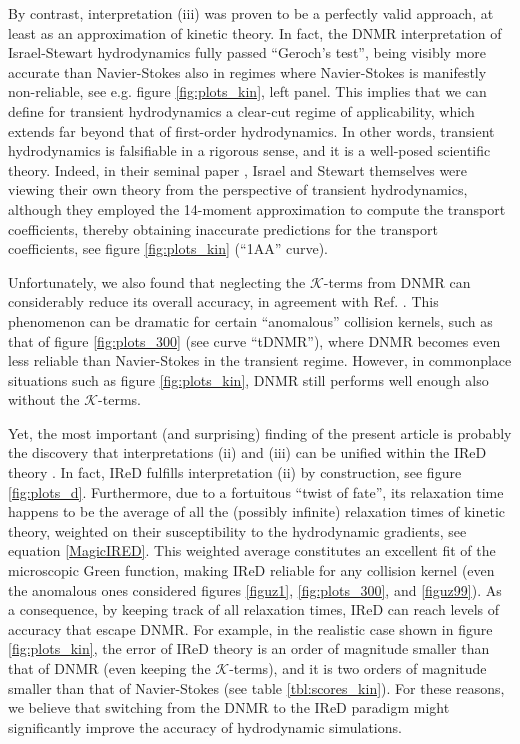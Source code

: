 \documentclass[a4paper, amsfonts, amssymb, amsmath, reprint, showkeys, nofootinbib, twoside, onecolumn,notitlepage]{revtex4-2}
\begin{document}
By contrast, interpretation (iii) was proven to be a perfectly valid approach, at least as an approximation of kinetic theory. In fact, the DNMR interpretation of Israel-Stewart hydrodynamics \cite{Denicol2012Boltzmann} fully passed ``Geroch's test'', being visibly more accurate than Navier-Stokes also in regimes where Navier-Stokes is manifestly non-reliable, see e.g. figure \ref{fig:plots_kin}, left panel. This implies that we can define for transient hydrodynamics a clear-cut regime of applicability, which extends far beyond that of first-order hydrodynamics. In other words, transient hydrodynamics is falsifiable in a rigorous sense, and it is a well-posed scientific theory. Indeed, in their seminal paper \cite{Israel_Stewart_1979}, Israel and Stewart themselves were viewing their own theory from the perspective of transient hydrodynamics, although they employed the 14-moment approximation to compute the transport coefficients, thereby obtaining inaccurate predictions for the transport coefficients, see figure \ref{fig:plots_kin} (``1AA'' curve). 

Unfortunately, we also found that neglecting the $\mathcal{K}$-terms from DNMR can considerably reduce its overall accuracy, in agreement with Ref. \cite{Denicol:2012vq}. This phenomenon can be dramatic for certain ``anomalous'' collision kernels, such as that of figure \ref{fig:plots_300} (see curve ``tDNMR''), where DNMR becomes even less reliable than Navier-Stokes in the transient regime. However, in commonplace situations such as figure \ref{fig:plots_kin}, DNMR still performs well enough also without the $\mathcal{K}$-terms.

Yet, the most important (and surprising) finding of the present article is probably the discovery that interpretations (ii) and (iii) can be unified within the IReD theory \cite{WagnerIReD2022}. In fact, IReD fulfills interpretation (ii) by construction, see figure \ref{fig:plots_d}. Furthermore, due to a fortuitous ``twist of fate'', its relaxation time happens to be the average of all the (possibly infinite) relaxation times of kinetic theory, weighted on their susceptibility to the hydrodynamic gradients, see equation \eqref{MagicIRED}. This weighted average constitutes an excellent fit of the microscopic Green function, making IReD reliable for any collision kernel (even the anomalous ones considered figures \ref{figuz1}, \ref{fig:plots_300}, and \ref{figuz99}). As a consequence, by keeping track of all relaxation times, IReD can reach levels of accuracy that escape DNMR. For example, in the realistic case shown in figure \ref{fig:plots_kin}, the error of IReD theory is an order of magnitude smaller than that of DNMR (even keeping the $\mathcal{K}$-terms), and it is two orders of magnitude smaller than that of Navier-Stokes (see table \ref{tbl:scores_kin}). For these reasons, we believe that switching from the DNMR to the IReD paradigm might significantly improve the accuracy of hydrodynamic simulations.
\end{document}

